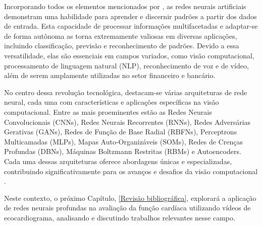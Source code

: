 Incorporando todos os elementos mencionados por \textcite{CHAI2021100134}, as redes neurais artificiais demonstram uma  habilidade para aprender e discernir padrões  a partir dos dados de entrada. Esta capacidade de processar informações multifacetadas e adaptar-se de forma autônoma as torna extremamente valiosas em diversas aplicações, incluindo classificação, previsão e reconhecimento de padrões. Devido a essa versatilidade, elas são essenciais em campos variados, como visão computacional, processamento de linguagem natural (NLP), reconhecimento de voz e de vídeo, além de serem amplamente utilizadas no setor financeiro e bancário.

No centro dessa revolução tecnológica, destacam-se várias arquiteturas de rede neural, cada uma com características e aplicações específicas na visão computacional. Entre as mais proeminentes estão as Redes Neurais Convolucionais (CNNs), Redes Neurais Recorrentes (RNNs), Redes Adversárias Gerativas (GANs), Redes de Função de Base Radial (RBFNs), Perceptrons Multicamadas (MLPs), Mapas Auto-Organizáveis (SOMs), Redes de Crenças Profundas (DBNs), Máquinas Boltzmann Restritas (RBMs) e Autoencoders. Cada uma dessas arquiteturas oferece abordagens únicas e especializadas, contribuindo significativamente para os avanços e desafios da visão computacional \cite{CHAI2021100134}.

Neste contexto, o próximo Capítulo, \ref{Revisão bibliográfica}, explorará a aplicação de redes neurais profundas na avaliação da função cardíaca utilizando vídeos de ecocardiograma, analisando e discutindo trabalhos relevantes nesse campo. 
